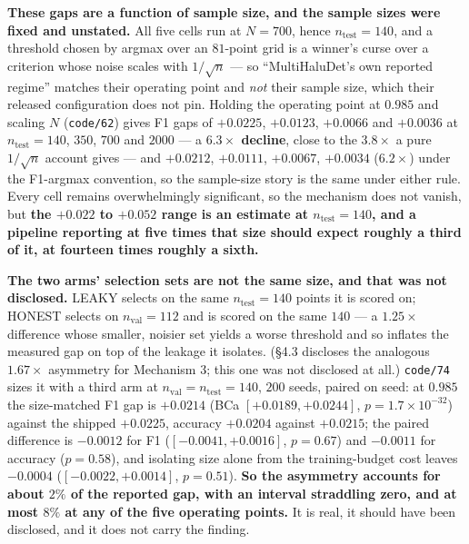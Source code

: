 \documentclass[10pt]{article} %
\begin{document}
\textbf{These gaps are a function of sample size, and the sample sizes were
fixed and unstated.} All five cells run at $N=700$, hence
$n_{\text{test}}=140$, and a threshold chosen by argmax over an $81$-point grid
is a winner's curse over a criterion whose noise scales with $1/\sqrt{n}$ --- so
``MultiHaluDet's own reported regime'' matches their operating point and
\emph{not} their sample size, which their released configuration does not pin.
Holding the operating point at $0.985$ and scaling $N$ (\texttt{code/62}) gives
F1 gaps of $+0.0225$, $+0.0123$, $+0.0066$ and $+0.0036$ at
$n_{\text{test}}=140$, $350$, $700$ and $2000$ --- a \textbf{$6.3\times$
decline}, close to the $3.8\times$ a pure $1/\sqrt{n}$ account gives --- and
$+0.0212$, $+0.0111$, $+0.0067$, $+0.0034$ ($6.2\times$) under the F1-argmax
convention, so the sample-size story is the same under either rule. Every cell
remains overwhelmingly significant, so the mechanism does not vanish, but
\textbf{the $+0.022$ to $+0.052$ range is an estimate at $n_{\text{test}}=140$,
and a pipeline reporting at five times that size should expect roughly a third
of it, at fourteen times roughly a sixth.}

\textbf{The two arms' selection sets are not the same size, and that was not
disclosed.} LEAKY selects on the same $n_{\text{test}}=140$ points it is scored
on; HONEST selects on $n_{\text{val}}=112$ and is scored on the same $140$ --- a
$1.25\times$ difference whose smaller, noisier set yields a worse threshold and
so inflates the measured gap on top of the leakage it isolates. (§4.3 discloses
the analogous $1.67\times$ asymmetry for Mechanism 3; this one was not disclosed
at all.) \texttt{code/74} sizes it with a third arm at
$n_{\text{val}}=n_{\text{test}}=140$, $200$ seeds, paired on seed: at $0.985$
the size-matched F1 gap is $\mathbf{+0.0214}$ (BCa $[+0.0189,+0.0244]$,
$p=1.7\times10^{-32}$) against the shipped $+0.0225$, accuracy $+0.0204$
against $+0.0215$; the paired difference is $-0.0012$ for F1
($[-0.0041,+0.0016]$, $p=0.67$) and $-0.0011$ for accuracy ($p=0.58$), and
isolating size alone from the training-budget cost leaves $-0.0004$
($[-0.0022,+0.0014]$, $p=0.51$). \textbf{So the asymmetry accounts for about
$2\%$ of the reported gap, with an interval straddling zero, and at most $8\%$
at any of the five operating points.} It is real, it should have been
disclosed, and it does not carry the finding.
\end{document}
